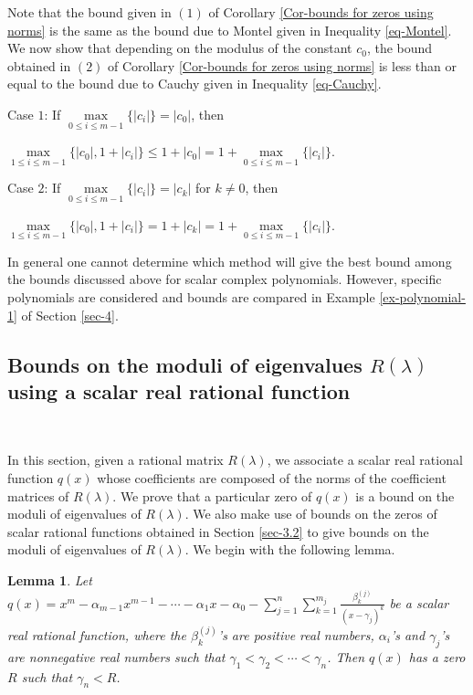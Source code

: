 \documentclass[12pt, reqno]{amsart}
\newtheorem{lemma}[theorem]{Lemma}
\theoremstyle{definition}
\theoremstyle{remark}
\numberwithin{equation}{section}
\begin{document}
\noindent
Note that the bound given in $(1)$ of Corollary \ref{Cor-bounds for zeros using norms} 
is the same as the bound due to Montel given in Inequality \eqref{eq-Montel}. We now 
show that depending on the modulus of the constant $c_0$, the bound obtained in $(2)$ 
of Corollary \ref{Cor-bounds for zeros using norms} is less than or equal to the bound 
due to Cauchy given in Inequality \eqref{eq-Cauchy}.

\noindent
Case $1$: If $\max\limits_{0 \leq i \leq m-1} \{|c_i| \} = |c_0|$, 
then 
\begin{center}
$\max\limits_{1 \leq i \leq m-1} \{|c_0|, 1+|c_i| \} \leq 1+|c_0| = 1+
\max\limits_{0 \leq i \leq m-1} \{|c_i| \}$.
\end{center}
Case $2$: If $\max\limits_{0 \leq i \leq m-1} \{|c_i| \} = |c_k|$ for $k \neq 0$, 
then 
\begin{center}
$\max\limits_{1 \leq i \leq m-1} \{|c_0|, 1+|c_i| \} = 1+|c_k| = 1+
\max\limits_{0 \leq i \leq m-1} \{|c_i| \}$.
\end{center}
In general one cannot determine which method will give the best bound among the bounds 
discussed above for scalar complex polynomials. However, specific polynomials are 
considered and bounds are compared in Example \ref{ex-polynomial-1} of Section \ref{sec-4}.


\subsection{Bounds on the moduli of eigenvalues $R(\lambda)$ using a scalar real rational function} 

\

In this section, given a rational matrix $R(\lambda)$, we associate a scalar 
real rational function $q(x)$ whose coefficients are composed of the norms of the 
coefficient matrices of $R(\lambda)$. We prove that a particular zero of $q(x)$ 
is a bound on the moduli of eigenvalues of $R(\lambda)$. We also make use of 
bounds on the zeros of scalar rational functions obtained in Section \ref{sec-3.2} 
to give bounds on the moduli of eigenvalues of $R(\lambda)$. We begin with the 
following lemma.
 
\begin{lemma}\label{Lem-zeros of rational function}
Let $q(x) = x^m-\alpha_{m-1}x^{m-1}-\cdots - \alpha_1 x - \alpha_0 - \displaystyle 
\sum_{j=1}^{n} \sum_{k=1}^{m_j} \frac{\beta_k^{(j)}}{(x-\gamma_j)^k}$ be a scalar real 
rational function, where the $\beta_k^{(j)}$'s are positive real numbers, $\alpha_i$'s 
and $\gamma_j$'s are nonnegative real numbers such that $\gamma_1 < \gamma_2 < \cdots 
< \gamma_n$. Then $q(x)$ has a zero $R$ such that $ \gamma_n < R$.
\end{lemma}
\end{document}
